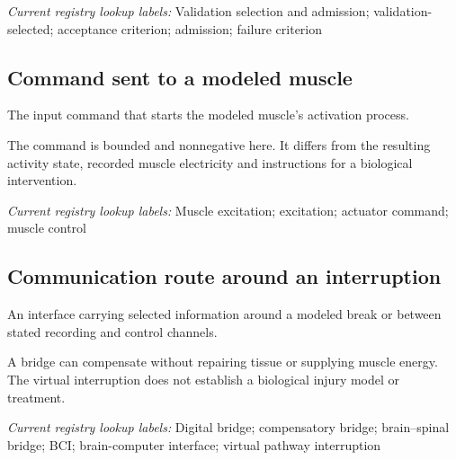 \noindent\textit{Current registry lookup labels:} Validation selection and admission; validation-selected; acceptance criterion; admission; failure criterion\par

\begin{samepage}
\subsection*{Command sent to a modeled muscle}
\noindent The input command that starts the modeled muscle’s activation process.\par
\end{samepage}
\begin{samepage}
\noindent The command is bounded and nonnegative here. It differs from the resulting activity state, recorded muscle electricity and instructions for a biological intervention.\par\nopagebreak[4]

\end{samepage}


\noindent\textit{Current registry lookup labels:} Muscle excitation; excitation; actuator command; muscle control\par

\begin{samepage}
\subsection*{Communication route around an interruption}
\noindent An interface carrying selected information around a modeled break or between stated recording and control channels.\par
\end{samepage}
\begin{samepage}
\noindent A bridge can compensate without repairing tissue or supplying muscle energy. The virtual interruption does not establish a biological injury model or treatment.\par\nopagebreak[4]

\end{samepage}


\noindent\textit{Current registry lookup labels:} Digital bridge; compensatory bridge; brain–spinal bridge; BCI; brain-computer interface; virtual pathway interruption\par

